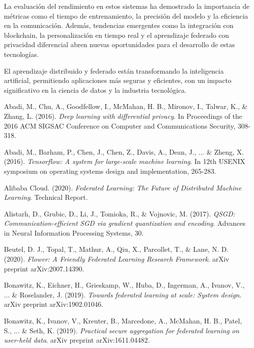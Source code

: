 La evaluación del rendimiento en estos sistemas ha demostrado la importancia de métricas como el tiempo de entrenamiento, la precisión del modelo y la eficiencia en la comunicación. Además, tendencias emergentes como la integración con blockchain, la personalización en tiempo real y el aprendizaje federado con privacidad diferencial abren nuevas oportunidades para el desarrollo de estas tecnologías.

El aprendizaje distribuido y federado están transformando la inteligencia artificial, permitiendo aplicaciones más seguras y eficientes, con un impacto significativo en la ciencia de datos y la industria tecnológica.
\begin{thebibliography}{99}
	
	Abadi, M., Chu, A., Goodfellow, I., McMahan, H. B., Mironov, I., Talwar, K., \& Zhang, L. (2016).
	\textit{Deep learning with differential privacy}.
	In Proceedings of the 2016 ACM SIGSAC Conference on Computer and Communications Security, 308-318.
	
	Abadi, M., Barham, P., Chen, J., Chen, Z., Davis, A., Dean, J., ... \& Zheng, X. (2016).
	\textit{Tensorflow: A system for large-scale machine learning}.
	In 12th USENIX symposium on operating systems design and implementation, 265-283.
	
	Alibaba Cloud. (2020).
	\textit{Federated Learning: The Future of Distributed Machine Learning}.
	Technical Report.
	
	Alistarh, D., Grubic, D., Li, J., Tomioka, R., \& Vojnovic, M. (2017).
	\textit{QSGD: Communication-efficient SGD via gradient quantization and encoding}.
	Advances in Neural Information Processing Systems, 30.
	
	Beutel, D. J., Topal, T., Mathur, A., Qiu, X., Parcollet, T., \& Lane, N. D. (2020).
	\textit{Flower: A Friendly Federated Learning Research Framework}.
	arXiv preprint arXiv:2007.14390.
	
	Bonawitz, K., Eichner, H., Grieskamp, W., Huba, D., Ingerman, A., Ivanov, V., ... \& Roselander, J. (2019).
	\textit{Towards federated learning at scale: System design}.
	arXiv preprint arXiv:1902.01046.
	
	Bonawitz, K., Ivanov, V., Kreuter, B., Marcedone, A., McMahan, H. B., Patel, S., ... \& Seth, K. (2019).
	\textit{Practical secure aggregation for federated learning on user-held data}.
	arXiv preprint arXiv:1611.04482.
	

\end{thebibliography}
